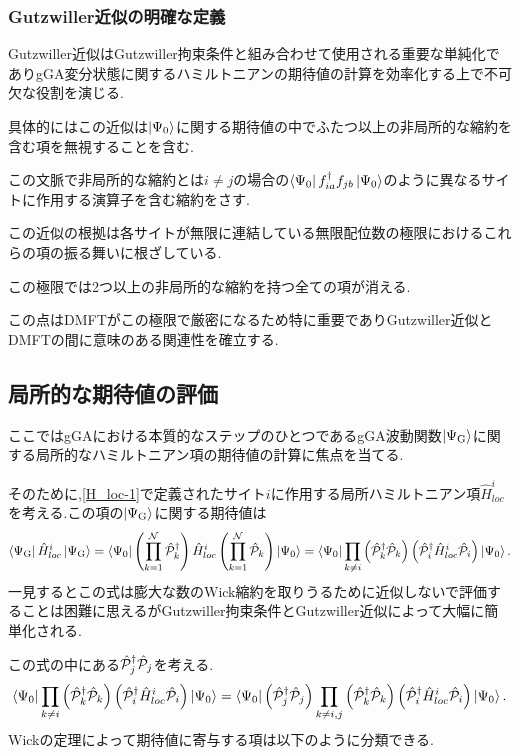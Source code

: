 \subsubsection{Gutzwiller近似の明確な定義}
Gutzwiller近似はGutzwiller拘束条件と組み合わせて使用される重要な単純化でありgGA変分状態に関するハミルトニアンの期待値の計算を効率化する上で不可欠な役割を演じる.

具体的にはこの近似は$\Ket{\Psi_{0}}$に関する期待値の中でふたつ以上の非局所的な縮約を含む項を無視することを含む.

この文脈で非局所的な縮約とは$i\ne j$の場合の$\Bra{\Psi_{0}}f^\dagger_{ia}f_{jb}\Ket{\Psi_{0}}$のように異なるサイトに作用する演算子を含む縮約をさす.

この近似の根拠は各サイトが無限に連結している無限配位数の極限におけるこれらの項の振る舞いに根ざしている.

この極限では2つ以上の非局所的な縮約を持つ全ての項が消える.

この点はDMFTがこの極限で厳密になるため特に重要でありGutzwiller近似とDMFTの間に意味のある関連性を確立する.

\subsection{局所的な期待値の評価}
ここではgGAにおける本質的なステップのひとつであるgGA波動関数$\Ket{\Psi_{\text{G}}}$に関する局所的なハミルトニアン項の期待値の計算に焦点を当てる.

そのために,\eqref{H_loc-1}で定義されたサイト$i$に作用する局所ハミルトニアン項$\hat{H}^{i}_{loc}$を考える.この項の$\Ket{\Psi_{\text{G}}}$に関する期待値は
\begin{equation}
    \Bra{\Psi_{\text{G}}}\hat{H}^{i}_{loc}\Ket{\Psi_{\text{G}}}=\Bra{\Psi_{0}}\left( \prod_{k=1}^{\mathcal{N}}\hat{\mathcal{P}}^\dagger_{k} \right)\hat{H}^{i}_{loc}\left( \prod_{k=1}^{\mathcal{N}}\hat{\mathcal{P}}_{k} \right)\Ket{\Psi_{0}}=\Bra{\Psi_{0}}\prod_{k\ne i}\left( \hat{\mathcal{P}}^\dagger_{k}\hat{\mathcal{P}}_{k} \right)\left( \hat{\mathcal{P}}^\dagger_{i}\hat{H}^{i}_{loc}\hat{\mathcal{P}}_{i} \right)\Ket{\Psi_{0}}. \label{H_loc-exception}
\end{equation}
一見するとこの式は膨大な数のWick縮約を取りうるために近似しないで評価することは困難に思えるがGutzwiller拘束条件とGutzwiller近似によって大幅に簡単化される.

この式の中にある$\hat{\mathcal{P}}^\dagger_{j}\hat{\mathcal{P}}_{j}$を考える.
\begin{equation}
    \Bra{\Psi_{0}}\prod_{k\ne i}\left( \hat{\mathcal{P}}^\dagger_{k}\hat{\mathcal{P}}_{k} \right)\left( \hat{\mathcal{P}}^\dagger_{i}\hat{H}^{i}_{loc}\hat{\mathcal{P}}_{i} \right)\Ket{\Psi_{0}} =\Bra{\Psi_{0}}\left( \hat{\mathcal{P}}^\dagger_{j}\hat{\mathcal{P}}_{j} \right)\prod_{k\ne i,j}\left( \hat{\mathcal{P}}^\dagger_{k}\hat{\mathcal{P}}_{k} \right)\left( \hat{\mathcal{P}}^\dagger_{i}\hat{H}^{i}_{loc}\hat{\mathcal{P}}_{i} \right)\Ket{\Psi_{0}}. 
\end{equation}
Wickの定理によって期待値に寄与する項は以下のように分類できる.


